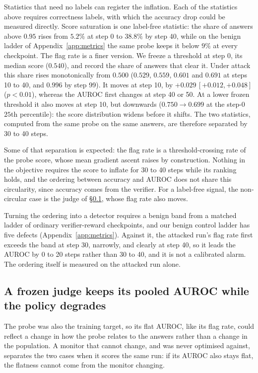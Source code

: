 \documentclass{article}
\begin{document}
Statistics that need no labels can register the inflation. Each of the statistics above requires correctness labels, with which the accuracy drop could be measured directly. Score saturation is one label-free statistic: the share of answers above $0.95$ rises from $5.2\%$ at step 0 to $38.8\%$ by step 40, while on the benign ladder of Appendix~\ref{app:metrics} the same probe keeps it below $9\%$ at every checkpoint. The flag rate is a finer version. We freeze a threshold at step 0, its median score ($0.540$), and record the share of answers that clear it. Under attack this share rises monotonically from $0.500$ ($0.529$, $0.559$, $0.601$ and $0.691$ at steps 10 to 40, and $0.996$ by step 99). It moves at step 10, by $+0.029\,[+0.012,+0.048]$ ($p<0.01$), whereas the AUROC first changes at step 40 or 50. At a lower frozen threshold it also moves at step 10, but downwards ($0.750 \to 0.699$ at the step-0 $25$th percentile): the score distribution widens before it shifts. The two statistics, computed from the same probe on the same answers, are therefore separated by 30 to 40 steps.

Some of that separation is expected: the flag rate is a threshold-crossing rate of the probe score, whose mean gradient ascent raises by construction. Nothing in the objective requires the score to inflate for 30 to 40 steps while its ranking holds, and the ordering between accuracy and AUROC does not share this circularity, since accuracy comes from the verifier. For a label-free signal, the non-circular case is the judge of \S\ref{sec:judge}, whose flag rate also moves.

Turning the ordering into a detector requires a benign band from a matched ladder of ordinary verifier-reward checkpoints, and our benign control ladder has five defects (Appendix~\ref{app:metrics}). Against it, the attacked run's flag rate first exceeds the band at step 30, narrowly, and clearly at step 40, so it leads the AUROC by 0 to 20 steps rather than 30 to 40, and it is not a calibrated alarm. The ordering itself is measured on the attacked run alone.

\subsection{A frozen judge keeps its pooled AUROC while the policy degrades}\label{sec:judge}

The probe was also the training target, so its flat AUROC, like its flag rate, could reflect a change in how the probe relates to the answers rather than a change in the population. A monitor that cannot change, and was never optimised against, separates the two cases when it scores the same run: if its AUROC also stays flat, the flatness cannot come from the monitor changing.
\end{document}
